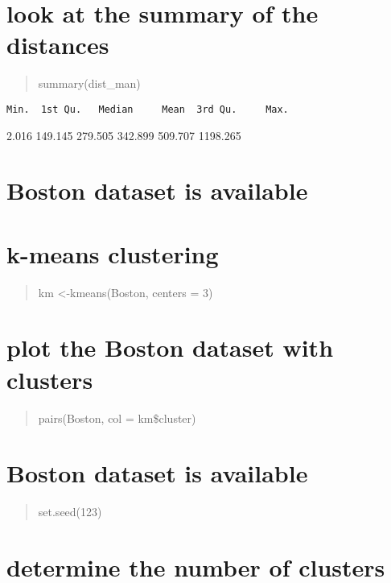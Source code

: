 \documentclass[]{article}
\begin{document}
\section{look at the summary of the
distances}\label{look-at-the-summary-of-the-distances-1}

\begin{quote}
summary(dist\_man)
\end{quote}

\begin{verbatim}
Min.  1st Qu.   Median     Mean  3rd Qu.     Max.  
\end{verbatim}

2.016 149.145 279.505 342.899 509.707 1198.265

\section{Boston dataset is available}\label{boston-dataset-is-available}

\section{k-means clustering}\label{k-means-clustering}

\begin{quote}
km \textless{}-kmeans(Boston, centers = 3)
\end{quote}

\section{plot the Boston dataset with
clusters}\label{plot-the-boston-dataset-with-clusters}

\begin{quote}
pairs(Boston, col = km\$cluster)
\end{quote}

\section{Boston dataset is
available}\label{boston-dataset-is-available-1}

\begin{quote}
set.seed(123)
\end{quote}

\section{determine the number of
clusters}\label{determine-the-number-of-clusters}
\end{document}
